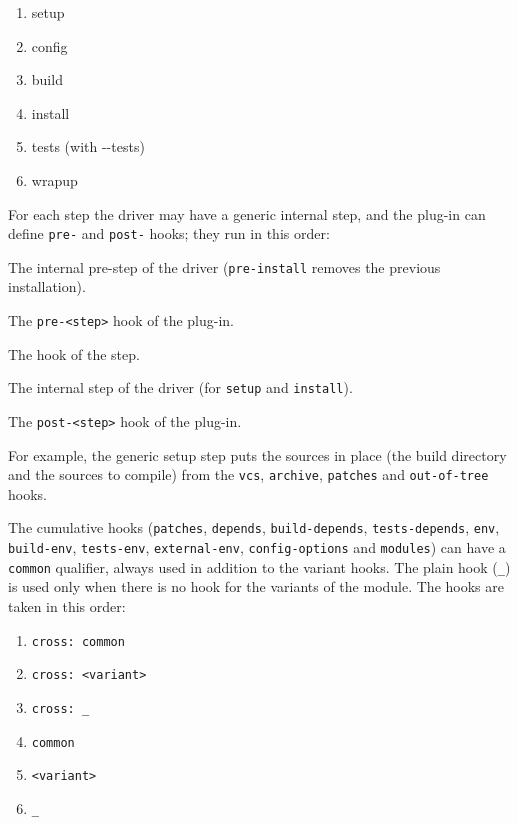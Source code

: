 \documentclass[a4paper,12pt,twoside]{article}
\newcommand{\code}[1]{\texttt{#1}}
\newcommand{\ddash}{-{}-}
\begin{document}
\begin{enumerate}
	\item setup
	\item config
	\item build
	\item install
	\item tests (with \ddash{}tests)
	\item wrapup
\end{enumerate}

For each step the driver may have a generic internal step, and the plug-in
can define \code{pre-} and \code{post-} hooks; they run in this order:

\begin{description}[font=\texttt,style=nextline]
	\item[generic pre-<step>] The internal pre-step of the driver (\code{pre-install} removes the previous installation).
	\item[pre-<step>] The \code{pre-<step>} hook of the plug-in.
	\item[<step>] The hook of the step.
	\item[generic <step>] The internal step of the driver (for \code{setup} and \code{install}).
	\item[post-<step>] The \code{post-<step>} hook of the plug-in.
\end{description}

For example, the generic setup step puts the sources in place (the build directory and the sources to compile) from the \code{vcs}, \code{archive}, \code{patches} and \code{out-of-tree} hooks.

The cumulative hooks (\code{patches}, \code{depends}, \code{build-depends}, \code{tests-depends}, \code{env}, \code{build-env}, \code{tests-env}, \code{external-env}, \code{config-options} and \code{modules}) can have a \code{common} qualifier, always used in addition to the variant hooks. The plain hook (\code{\_}) is used only when there is no hook for the variants of the module. The hooks are taken in this order:

\begin{enumerate}
	\item \code{cross: common}
	\item \code{cross: <variant>}
	\item \code{cross: \_}
	\item \code{common}
	\item \code{<variant>}
	\item \code{\_}
\end{enumerate}
\end{document}

